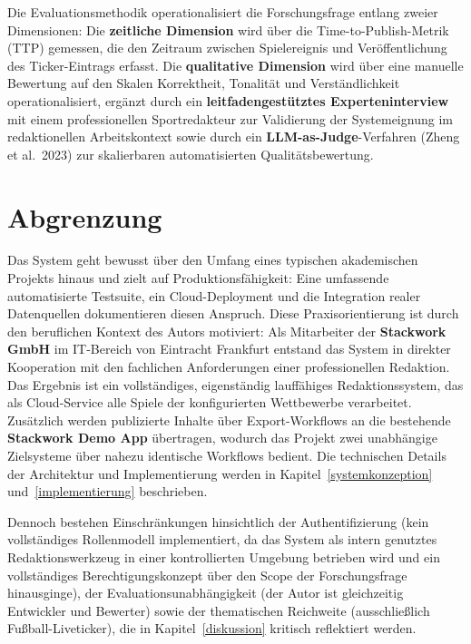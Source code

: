 Die Evaluationsmethodik operationalisiert die Forschungsfrage entlang
zweier Dimensionen: Die \textbf{zeitliche Dimension} wird über die
Time-to-Publish-Metrik (TTP) gemessen, die den Zeitraum zwischen
Spielereignis und Veröffentlichung des Ticker-Eintrags erfasst. Die
\textbf{qualitative Dimension} wird über eine manuelle Bewertung auf den
Skalen Korrektheit, Tonalität und Verständlichkeit operationalisiert,
ergänzt durch ein \textbf{leitfadengestütztes Experteninterview} mit einem
professionellen Sportredakteur zur Validierung der Systemeignung im
redaktionellen Arbeitskontext sowie durch ein \textbf{LLM-as-Judge}-Verfahren
(Zheng et al.~2023) zur skalierbaren automatisierten Qualitätsbewertung.

\section{Abgrenzung}\label{abgrenzung}

Das System geht bewusst über den Umfang eines typischen akademischen
Projekts hinaus und zielt auf Produktionsfähigkeit: Eine umfassende
automatisierte Testsuite, ein Cloud-Deployment und die Integration
realer Datenquellen dokumentieren diesen Anspruch. Diese
Praxisorientierung ist durch den beruflichen Kontext des Autors
motiviert: Als Mitarbeiter der \textbf{Stackwork GmbH} im IT-Bereich von
Eintracht Frankfurt entstand das System in direkter Kooperation mit den
fachlichen Anforderungen einer professionellen Redaktion. Das Ergebnis
ist ein vollständiges, eigenständig lauffähiges Redaktionssystem, das
als Cloud-Service alle Spiele der konfigurierten Wettbewerbe
verarbeitet. Zusätzlich werden publizierte Inhalte über Export-Workflows
an die bestehende \textbf{Stackwork Demo App} übertragen, wodurch das
Projekt zwei unabhängige Zielsysteme über nahezu identische Workflows
bedient. Die technischen Details der Architektur und Implementierung
werden in Kapitel~\ref{systemkonzeption} und~\ref{implementierung} beschrieben.

Dennoch bestehen Einschränkungen hinsichtlich der Authentifizierung
(kein vollständiges Rollenmodell implementiert, da das System als
intern genutztes Redaktionswerkzeug in einer kontrollierten Umgebung
betrieben wird und ein vollständiges Berechtigungskonzept über den
Scope der Forschungsfrage hinausginge), der Evaluationsunabhängigkeit
(der Autor ist gleichzeitig Entwickler und Bewerter) sowie der
thematischen Reichweite (ausschließlich Fußball-Liveticker), die in
Kapitel~\ref{diskussion} kritisch reflektiert werden.



